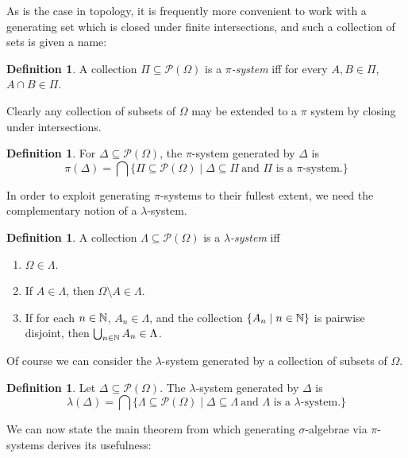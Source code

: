 \documentclass{amsart}
\theoremstyle{definition}
\newtheorem{definition}[theorem]{Definition}
\theoremstyle{remark}
\newcommand{\bldset}[2]{\{{#1}\mid{#2}\}}
\begin{document}

As is the case in topology, it is frequently more convenient to work with a generating set which is closed under finite intersections, and such a collection of sets is given a name:

\begin{definition}
A collection $\Pi \subseteq \mathcal P (\Omega)$ is a {\em $\pi$-system} iff for every $A, B \in \Pi$, $A \cap  B \in \Pi$.
\end{definition}

Clearly any collection of subsets of $\Omega$ may be extended to a $\pi$ system by closing under intersections.

\begin{definition}
For $\Delta \subseteq \mathcal P (\Omega)$, the $\pi$-system generated by $\Delta$ is
\[ \pi(\Delta) = \bigcap \bldset{\Pi \subseteq \mathcal P (\Omega)}{\Delta \subseteq \Pi \ \text{and $\Pi$ is a $\pi$-system.}} \]
\end{definition}

In order to exploit generating $\pi$-systems to their fullest extent, we need the complementary notion of a $\lambda$-system.

\begin{definition}
A collection $\Lambda \subseteq \mathcal P (\Omega)$ is a {\em $\lambda$-system} iff
\begin{enumerate}
\item $\Omega \in \Lambda$.
\item If $A \in \Lambda$, then $\Omega \setminus A \in \Lambda$.
\item If for each $n \in \mathbb{N}$, $A_n \in \Lambda$, and the collection $\bldset{A_n}{n \in \N}$ is pairwise disjoint, then $\bigcup_{n \in \mathbb{N}} A_n \in \Lambda$.
\end{enumerate}
\end{definition}

Of course we can consider the $\lambda$-system generated by a collection of subsets of $\Omega$.

\begin{definition}
Let $\Delta \subseteq \mathcal P (\Omega)$. The $\lambda$-system generated by $\Delta$ is
\[ \lambda(\Delta) = \bigcap \bldset{\Lambda \subseteq \mathcal P (\Omega)}{\Delta \subseteq \Lambda \ \text{and $\Lambda$ is a $\lambda$-system.}} \]
\end{definition}

We can now state the main theorem from which generating $\sigma$-algebrae via $\pi$-systems derives its usefulness:
\end{document}
